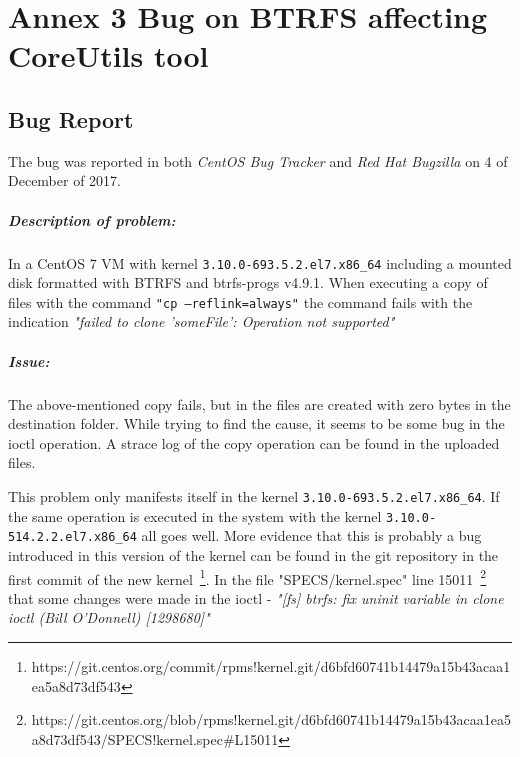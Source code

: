\chapter{Annex 3 Bug on BTRFS affecting CoreUtils tool}
\label{ann:bug}

\section{Bug Report}
\label{sec:bug_report}

The bug was reported in both \textit{CentOS Bug Tracker} and \textit{Red Hat Bugzilla} on 4 of December of 2017.

\paragraph{Description of problem:}

In a CentOS 7 VM with kernel \texttt{3.10.0-693.5.2.el7.x86\_64} including a mounted disk formatted with BTRFS and btrfs-progs v4.9.1.
When executing a copy of files with the command \texttt{"cp --reflink=always"} the command fails with the indication \textit{"failed to clone 'someFile': Operation not supported"}

\paragraph{Issue:}

The above-mentioned copy fails, but in the files are created with zero bytes in the destination folder.
While trying to find the cause, it seems to be some bug in the ioctl operation. A strace log of the copy operation can be found in the uploaded files.

This problem only manifests itself in the kernel \texttt{3.10.0-693.5.2.el7.x86\_64}. If the same operation is executed in the system with the kernel \texttt{3.10.0-514.2.2.el7.x86\_64} all goes well.
More evidence that this is probably a bug introduced in this version of the kernel can be found in the git repository in the first commit of the new kernel~\footnote{https://git.centos.org/commit/rpms!kernel.git/d6bfd60741b14479a15b43acaa1ea5a8d73df543}.
In the file "SPECS/kernel.spec" line 15011~\footnote{https://git.centos.org/blob/rpms!kernel.git/d6bfd60741b14479a15b43acaa1ea5a8d73df543/SPECS!kernel.spec\#L15011} that some changes were made in the ioctl - \textit{"[fs] btrfs: fix uninit variable in clone ioctl (Bill O'Donnell) [1298680]"}

